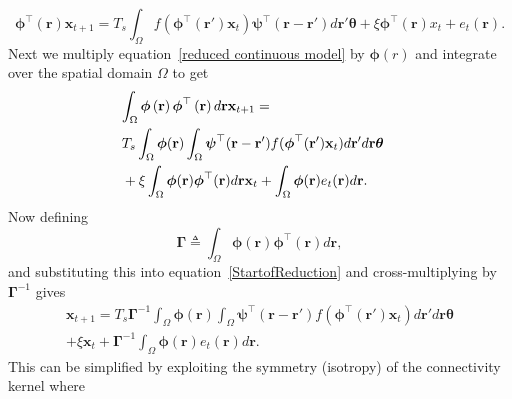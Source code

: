 \documentclass[10pt,a4paper]{article}
\begin{document}
\begin{equation}
	\label{reduced continuous model}\boldsymbol{\phi}^{\top}(\mathbf{r})\mathbf{x}_{t+1}= T_s\int_\Omega{f(\boldsymbol{\phi}^{\top}(\mathbf{r}')\mathbf{x}_t )\boldsymbol{\psi}^{\top}(\mathbf{r}-\mathbf{r}')d\mathbf{r}'}\boldsymbol{\theta}
	+ \xi\boldsymbol{\phi}^{\top}(\mathbf{r})x_t + e_t(\mathbf{r}). 
\end{equation}
Next we multiply equation~\ref{reduced continuous model} by $\boldsymbol{\phi}(r)$ and integrate over the spatial domain $\Omega$ to get 
\begin{equation}
    \begin{split}
	\label{StartofReduction}
	\lefteqn{ \int_\Omega {\boldsymbol{\phi} \left(\mathbf{r}\right)\boldsymbol{\phi}^{\top}\left(\mathbf{r}\right) d\mathbf{r}} \mathbf{x}_{t+1}=} \\
 &T_s \int_\Omega {\boldsymbol{\phi} (\mathbf{r}) \int_\Omega {\boldsymbol{\psi}^{\top} (\mathbf{r}-\mathbf{r}') f(\boldsymbol{\phi}^{\top}(\mathbf{r}') \mathbf{x}_t ) d\mathbf{r}'}d\mathbf{r}}\boldsymbol{\theta}  \\ & + \xi\int_\Omega {\boldsymbol{\phi}(\mathbf{r})\boldsymbol{\phi}^{\top}(\mathbf{r})d\mathbf{r}} \mathbf{x}_t+
\int_\Omega{\boldsymbol{\phi} (\mathbf{r}) e_t(\mathbf{r})d\mathbf{r}}. 
\end{split}
\end{equation}
Now defining
\begin{equation}\label{eq:DefGamma}
	\boldsymbol{\Gamma} \triangleq \int_\Omega {\boldsymbol{\phi} \left(\mathbf{r}\right)\boldsymbol{\phi} ^{\top}\left(\mathbf{r}\right)d\mathbf{r}}, 
\end{equation}
and substituting this into equation~\ref{StartofReduction} and cross-multiplying by $\boldsymbol{\Gamma}^{-1}$ gives 
\begin{equation}
    \label{eq:ReducedForm}
    \begin{split}
	 \mathbf{x}_{t+1} = T_s\boldsymbol{\Gamma}^{-1}
	 \int_\Omega \boldsymbol{\phi}(\mathbf{r}) 
	 \int_\Omega \boldsymbol{\psi}^{\top} (\mathbf{r}-\mathbf{r}')f(\boldsymbol{\phi}^{\top}(\mathbf{r}')\mathbf{x}_t) d\mathbf{r}' d\mathbf{r} \boldsymbol{\theta} \\ 
	 + \xi\mathbf{x}_t + \boldsymbol{\Gamma}^{-1} \int_\Omega{\boldsymbol{\phi}(\mathbf{r}) e_t(\mathbf{r})d\mathbf{r}}.
	 \end{split}
\end{equation}
This can be simplified by exploiting the symmetry (isotropy) of the connectivity kernel where
\end{document}
